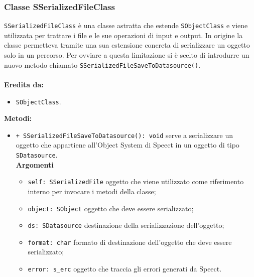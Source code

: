 \subsubsection{Classe SSerializedFileClass}
\texttt{SSerializedFileClass} è una classe astratta che estende \texttt{SObjectClass} e viene utilizzata per trattare i file e le sue operazioni di input e output.
In origine la classe permetteva tramite una sua estensione concreta di serializzare un oggetto solo in un percorso. Per ovviare a questa limitazione si è scelto di introdurre un nuovo metodo chiamato \texttt{SSerializedFileSaveToDatasource()}.\\\\
\textbf{Eredita da:}
\begin{itemize}
	\item \texttt{SObjectClass}.
\end{itemize}
\textbf{Metodi:}
\begin{itemize}
	\item \texttt{+ SSerializedFileSaveToDatasource(): void} serve a serializzare un oggetto che appartiene all'Object System di Speect in un oggetto di tipo \texttt{SDatasource}.\\
	\textbf{Argomenti}
	\begin{itemize}
		\item \texttt{self: SSerializedFile} oggetto che viene utilizzato come riferimento interno per invocare i metodi della classe; 
		\item \texttt{object: SObject} oggetto che deve essere serializzato;
		\item \texttt{ds: SDatasource} destinazione della serializzazione dell'oggetto;
		\item \texttt{format: char} formato di destinazione dell'oggetto che deve essere serializzato;
		\item \texttt{error: s\_erc} oggetto che traccia gli errori generati da Speect.
	\end{itemize}
\end{itemize}
 

